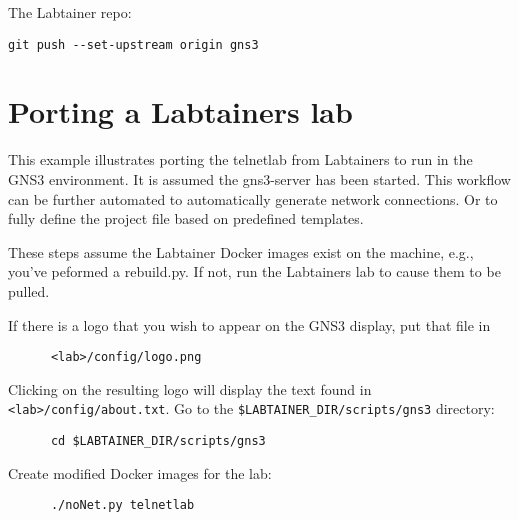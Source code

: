 \documentclass[12pt]{article}
\begin{document}
\noindent The Labtainer repo:
\begin{verbatim}
git push --set-upstream origin gns3
\end{verbatim}


\section{Porting a Labtainers lab}
This example illustrates porting the telnetlab from Labtainers to run in the GNS3 environment.
It is assumed the gns3-server has been started.
This workflow can be further automated to automatically generate network connections.  Or to fully define the project
file based on predefined templates.

These steps assume the Labtainer Docker images exist on the machine, e.g., you've peformed a rebuild.py.  If not, run the Labtainers lab
to cause them to be pulled. 

\bigskip
If there is a logo that you wish to appear on the GNS3 display, put that file in 
\begin{verbatim}
      <lab>/config/logo.png
\end{verbatim}

\noindent Clicking on the resulting logo will display the text found in {\tt <lab>/config/about.txt}.
\bigskip
Go to the {\tt \$LABTAINER\_DIR/scripts/gns3} directory:
\begin{verbatim}
      cd $LABTAINER_DIR/scripts/gns3
\end{verbatim}

Create modified Docker images for the lab:
\begin{verbatim}
      ./noNet.py telnetlab
\end{verbatim}
\end{document}
